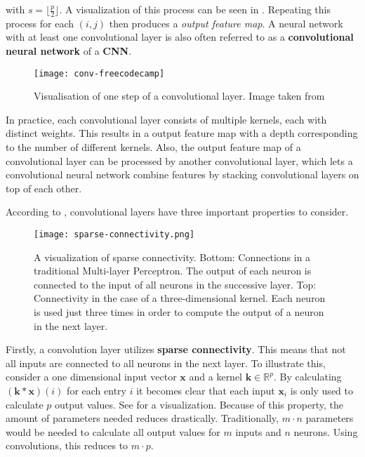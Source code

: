 with $s = \lfloor \frac{p}{2} \rfloor$.
A visualization of this process can be seen in .
Repeating this process for each $(i,j)$ then produces a \textit{output feature map}.
A neural network with at least one convolutional layer is also often referred to as a \textbf{convolutional neural network} of a \textbf{CNN}.

\begin{figure}[htb!]
    \centering
    \texttt{[image: conv-freecodecamp]}
    \caption{Visualisation of one step of a convolutional layer. Image taken from \cite{dertat_applied_2017}}
    \label{fig:conv-vis}
\end{figure}

In practice, each convolutional layer consists of multiple kernels, each with distinct weights.
This results in a output feature map with a depth corresponding to the number of different kernels.
Also, the output feature map of a convolutional layer can be processed by another convolutional layer, which lets a convolutional neural network combine features by stacking convolutional layers on top of each other.

According to \cite{goodfellow_deep_2016}, convolutional layers have three important properties to consider.

\begin{figure}[htb!]
    \centering
    \texttt{[image: sparse-connectivity.png]}
    \caption{A visualization of sparse connectivity. Bottom: Connections in a traditional Multi-layer Perceptron. The output of each neuron is connected to the input of all neurons in the successive layer. Top: Connectivity in the case of a three-dimensional kernel. Each neuron is used just three times in order to compute the output of a neuron in the next layer.}
    \label{fig:sparse-connectivity}
\end{figure}

Firstly, a convolution layer utilizes \textbf{sparse connectivity}.
This means that not all inputs are connected to all neurons in the next layer.
To illustrate this, consider a one dimensional input vector $\bm{x}$ and a kernel $\bm{k} \in \mathbb{R}^p$.
By calculating $(\bm{k} * \bm{x})(i)$ for each entry $i$ it becomes clear that each input $\bm{x}_i$ is only used to calculate $p$ output values.
See  for a visualization.
Because of this property, the amount of parameters needed reduces drastically.
Traditionally, $m \cdot n$ parameters would be needed to calculate all output values for $m$ inputs and $n$ neurons.
Using convolutions, this reduces to $m \cdot p$.

